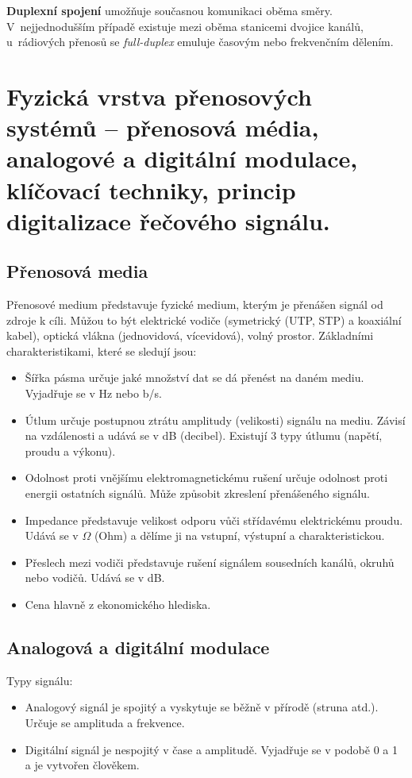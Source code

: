 \textbf{Duplexní spojení} umožňuje současnou komunikaci oběma směry. V~nejjednodušším případě existuje mezi oběma stanicemi dvojice kanálů, u~rádiových přenosů se \emph{full-duplex} emuluje časovým nebo frekvenčním dělením.

\clearpage
\section{Fyzická vrstva přenosových systémů -- přenosová média, analogové a digitální modulace, klíčovací techniky, princip digitalizace řečového signálu.}

\subsection{Přenosová media}

Přenosové medium představuje fyzické medium, kterým je přenášen signál od zdroje k cíli. Můžou to být elektrické vodiče (symetrický (UTP, STP) a koaxiální kabel), optická vlákna (jednovidová, vícevidová), volný prostor.
Základními charakteristikami, které se sledují jsou:
\begin{itemize}[noitemsep]
    \item Šířka pásma určuje jaké množství dat se dá přenést na daném mediu. Vyjadřuje se v Hz nebo b/s. 
    \item Útlum určuje postupnou ztrátu amplitudy (velikosti) signálu na mediu. Závisí na vzdálenosti a udává se v dB (decibel). Existují 3 typy útlumu (napětí, proudu a výkonu).
    \item Odolnost proti vnějšímu elektromagnetickému rušení určuje odolnost proti energii ostatních signálů. Může způsobit zkreslení přenášeného signálu. 
    \item Impedance představuje velikost odporu vůči střídavému elektrickému proudu. Udává se v $\Omega$ (Ohm) a dělíme ji na vstupní, výstupní a charakteristickou. 
    \item Přeslech mezi vodiči představuje rušení signálem sousedních kanálů, okruhů nebo vodičů. Udává se v dB.
    \item Cena hlavně z ekonomického hlediska.
\end{itemize}


\subsection{Analogová a digitální modulace}
Typy signálu:
\begin{itemize}[noitemsep]
    \item Analogový signál je spojitý a vyskytuje se běžně v přírodě (struna atd.). Určuje se amplituda a frekvence.
    \item Digitální signál je nespojitý v čase a amplitudě. Vyjadřuje se v podobě 0 a 1 a je vytvořen člověkem.
\end{itemize}

